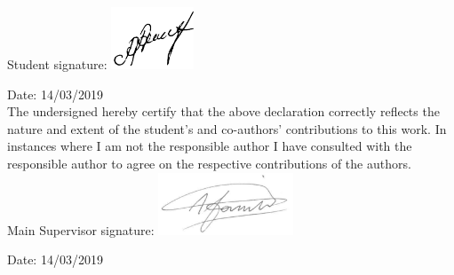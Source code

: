 Student signature:
\includegraphics[height=5em]{AAsignature.png}


Date: 14/03/2019\\

The undersigned hereby certify that the above declaration correctly reflects the nature and extent of the student's and co-authors' contributions to this work. In instances where I am not the responsible author I have consulted with the responsible author to agree on the respective contributions of the authors.\\


Main Supervisor signature:
\includegraphics[height=5em]{AFsignature.pdf}

Date: 14/03/2019\\

